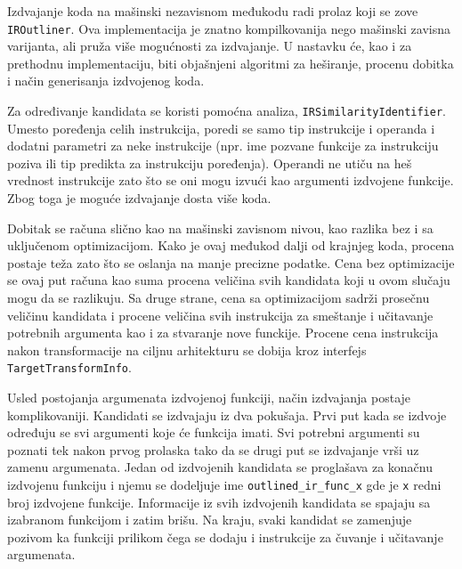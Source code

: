 \documentclass[12pt,oneside]{memoir}
\begin{document}
Izdvajanje koda na mašinski nezavisnom međukodu radi prolaz koji se zove \verb|IROutliner|.
Ova implementacija je znatno kompilkovanija nego mašinski zavisna varijanta, ali pruža više mogućnosti za izdvajanje.
U nastavku će, kao i za prethodnu implementaciju, biti objašnjeni algoritmi za heširanje, procenu dobitka i način generisanja izdvojenog koda.

Za određivanje kandidata se koristi pomoćna analiza, \verb|IRSimilarityIdentifier|.
Umesto poređenja celih instrukcija, poredi se samo tip instrukcije i operanda i dodatni parametri za neke instrukcije (npr. ime pozvane funkcije za instrukciju poziva ili tip predikta za instrukciju poređenja).
Operandi ne utiču na heš vrednost instrukcije zato što se oni mogu izvući kao argumenti izdvojene funkcije.
Zbog toga je moguće izdvajanje dosta više koda.

Dobitak se računa slično kao na mašinski zavisnom nivou, kao razlika bez i sa uključenom optimizacijom.
Kako je ovaj međukod dalji od krajnjeg koda, procena postaje teža zato što se oslanja na manje precizne podatke.
Cena bez optimizacije se ovaj put računa kao suma procena veličina svih kandidata koji u ovom slučaju mogu da se razlikuju.
Sa druge strane, cena sa optimizacijom sadrži prosečnu veličinu kandidata i procene veličina svih instrukcija za smeštanje i učitavanje potrebnih argumenta kao i za stvaranje nove funckije.
Procene cena instrukcija nakon transformacije na ciljnu arhitekturu se dobija kroz interfejs \verb|TargetTransformInfo|.

Usled postojanja argumenata izdvojenoj funkciji, način izdvajanja postaje komplikovaniji.
Kandidati se izdvajaju iz dva pokušaja. Prvi put kada se izdvoje određuju se svi argumenti koje će funkcija imati.
Svi potrebni argumenti su poznati tek nakon prvog prolaska tako da se drugi put se izdvajanje vrši uz zamenu argumenata.
Jedan od izdvojenih kandidata se proglašava za konačnu izdvojenu funkciju i
njemu se dodeljuje ime \verb|outlined_ir_func_x| gde je \verb|x| redni broj izdvojene funkcije.
Informacije iz svih izdvojenih kandidata se spajaju sa izabranom funkcijom i zatim brišu.
Na kraju, svaki kandidat se zamenjuje pozivom ka funkciji prilikom čega se dodaju i instrukcije za čuvanje i učitavanje argumenata.
\end{document}
